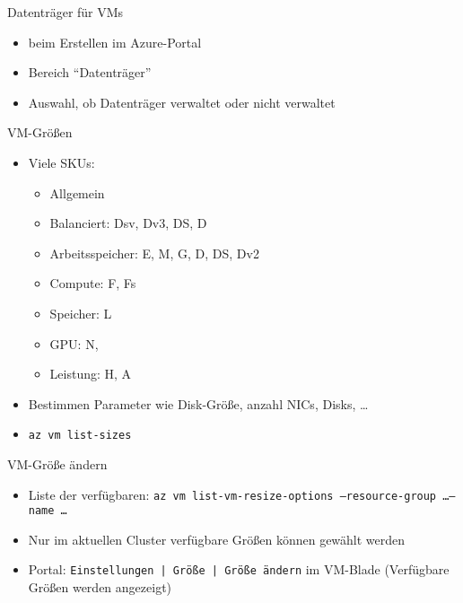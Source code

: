 \begin{flashcard}[Definition]{Datenträger für VMs}
    \begin{itemize}
        \item beim Erstellen im Azure-Portal
        \item Bereich ``Datenträger''
        \item Auswahl, ob Datenträger verwaltet oder nicht verwaltet
    \end{itemize}
\end{flashcard}


\begin{flashcard}[Definition]{VM-Größen}
    \begin{itemize}
        \item Viele SKUs:
            \begin{itemize}
                \item Allgemein
                \item Balanciert: Dsv, Dv3, DS, D
                \item Arbeitsspeicher: E, M, G, D, DS, Dv2
                \item Compute: F, Fs
                \item Speicher: L
                \item GPU: N,
                \item Leistung: H, A
            \end{itemize}
        \item Bestimmen Parameter wie Disk-Größe, anzahl NICs, Disks, \ldots
        \item \texttt{az vm list-sizes}
    \end{itemize}
\end{flashcard}

\begin{flashcard}[Definition]{VM-Größe ändern}
    \begin{itemize}
        \item Liste der verfügbaren:\newline
            \texttt{az vm list-vm-resize-options --resource-group \ldots --name \ldots}
        \item Nur im aktuellen Cluster verfügbare Größen können gewählt werden
        \item Portal: \texttt{Einstellungen | Größe | Größe ändern} im VM-Blade\newline
            (Verfügbare Größen werden angezeigt)
    \end{itemize}
\end{flashcard}

